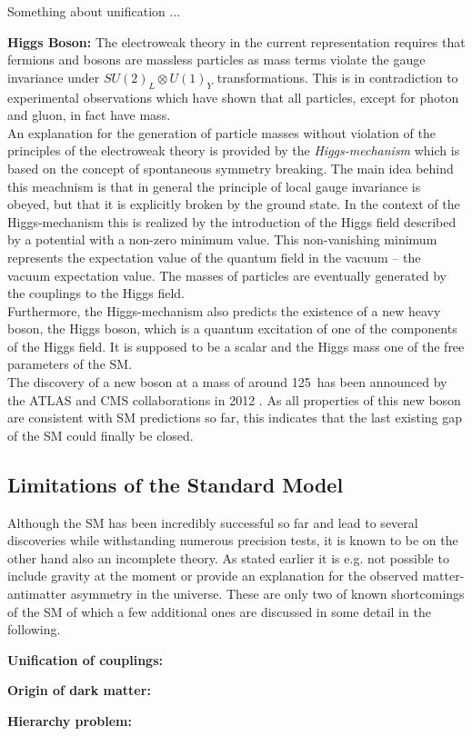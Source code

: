 \begin{description}
\begin{description}
 \end{description}
Something about unification ...
\item \textbf{Higgs Boson:} The electroweak theory in the current representation requires that fermions and bosons are massless particles as mass terms violate the gauge invariance under $SU(2)_{L} \otimes U(1)_{Y}$ transformations. This is in contradiction to experimental observations which have shown that all particles, except for photon and gluon, in fact have mass. \\
An explanation for the generation of particle masses without violation of the principles of the electroweak theory is provided by the \textit{Higgs-mechanism}  which is based on the concept of spontaneous symmetry breaking. The main idea behind this meachnism is that in general the principle of local gauge invariance is obeyed, but that it is explicitly broken by the ground state. In the context of the Higgs-mechanism this is realized by the introduction of the Higgs field described by a potential with a non-zero minimum value. This non-vanishing minimum represents the expectation value of the quantum field in the vacuum -- the vacuum expectation value. The masses of particles are eventually generated by the couplings to the Higgs field. \\
Furthermore, the Higgs-mechanism also predicts the existence of a new heavy boson, the Higgs boson, which is a quantum excitation of one of the components of the Higgs field. It is supposed to be a scalar and the Higgs mass one of the free parameters of the SM. \\
The discovery of a new boson at a mass of around 125~\gev has been announced by the ATLAS and CMS collaborations in 2012 . As all properties of this new boson are consistent with SM predictions so far, this indicates that the last existing gap of the SM could finally be closed. 
\end{description}

\subsection{Limitations of the Standard Model}
\label{subsec:sm_shortcomings}
Although the SM has been incredibly successful so far and lead to several discoveries while withstanding numerous precision tests, it is known to be on the other hand also an incomplete theory. As stated earlier it is e.g. not possible to include gravity at the moment or provide an explanation for the observed matter-antimatter asymmetry in the universe. These are only two of known shortcomings of the SM of which a few additional ones are discussed in some detail in the following.
\begin{description}
\item \textbf{Unification of couplings:}
\item \textbf{Origin of dark matter:}
\item \textbf{Hierarchy problem:}
\end{description}

